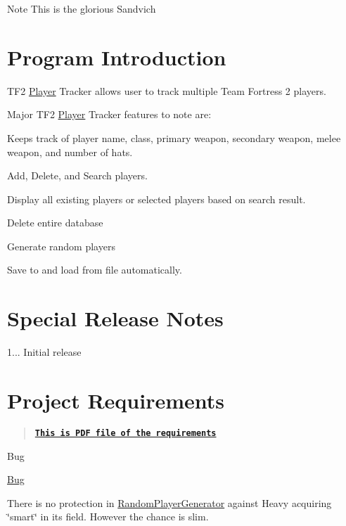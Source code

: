 \begin{DoxyNote}{Note}
This is the glorious Sandvich 
\end{DoxyNote}
\hypertarget{index_intro}{}\section{Program Introduction}\label{index_intro}
T\+F2 \hyperlink{class_player}{Player} Tracker allows user to track multiple Team Fortress 2 players.

Major T\+F2 \hyperlink{class_player}{Player} Tracker features to note are\+:


\begin{DoxyItemize}
\item Keeps track of player name, class, primary weapon, secondary weapon, melee weapon, and number of hats.
\item Add, Delete, and Search players.
\item Display all existing players or selected players based on search result.
\item Delete entire database
\item Generate random players
\item Save to and load from file automatically.
\end{DoxyItemize}



 \hypertarget{index_notes}{}\section{Special Release Notes}\label{index_notes}

\begin{DoxyItemize}
\item 1... Initial release
\end{DoxyItemize}



 \hypertarget{index_requirements}{}\section{Project Requirements}\label{index_requirements}
\begin{quote}
\href{DS-OOP-Project.pdf}{\tt {\bfseries This is P\+D\+F file of the requirements}} \end{quote}




 \begin{DoxyRefDesc}{Bug}
\item[\hyperlink{bug__bug000001}{Bug}]
\begin{DoxyItemize}
\item There is no protection in \hyperlink{class_random_player_generator}{Random\+Player\+Generator} against Heavy acquiring \char`\"{}smart\char`\"{} in its field. However the chance is slim.
\end{DoxyItemize}\end{DoxyRefDesc}





